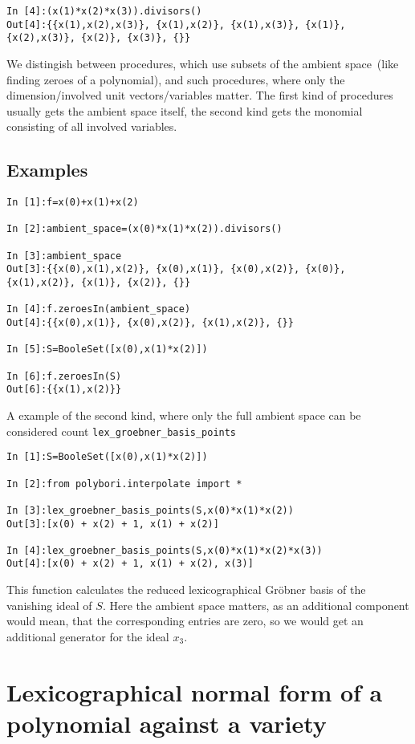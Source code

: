 \documentclass[]{article}
\newcommand{\Groebner}{Gr\"{o}bner\xspace}
\begin{document}
\begin{verbatim}
In [4]:(x(1)*x(2)*x(3)).divisors()
Out[4]:{{x(1),x(2),x(3)}, {x(1),x(2)}, {x(1),x(3)}, {x(1)}, {x(2),x(3)}, {x(2)}, {x(3)}, {}}
\end{verbatim}

We distingish between procedures, which use subsets of the ambient space~(like
finding zeroes of a polynomial),  and such procedures, where
only the dimension/involved unit vectors/variables matter.
The first kind of procedures usually gets the ambient space itself, the second kind gets the monomial consisting of all involved variables.

\subsection{Examples}
\begin{verbatim}
In [1]:f=x(0)+x(1)+x(2)

In [2]:ambient_space=(x(0)*x(1)*x(2)).divisors()

In [3]:ambient_space
Out[3]:{{x(0),x(1),x(2)}, {x(0),x(1)}, {x(0),x(2)}, {x(0)}, {x(1),x(2)}, {x(1)}, {x(2)}, {}}

In [4]:f.zeroesIn(ambient_space)
Out[4]:{{x(0),x(1)}, {x(0),x(2)}, {x(1),x(2)}, {}}

In [5]:S=BooleSet([x(0),x(1)*x(2)])

In [6]:f.zeroesIn(S)
Out[6]:{{x(1),x(2)}}
\end{verbatim}

A example of the second kind, where only the full ambient space can be considered count \verb|lex_groebner_basis_points|
\begin{verbatim}
In [1]:S=BooleSet([x(0),x(1)*x(2)])

In [2]:from polybori.interpolate import *              

In [3]:lex_groebner_basis_points(S,x(0)*x(1)*x(2))
Out[3]:[x(0) + x(2) + 1, x(1) + x(2)]

In [4]:lex_groebner_basis_points(S,x(0)*x(1)*x(2)*x(3))
Out[4]:[x(0) + x(2) + 1, x(1) + x(2), x(3)]
\end{verbatim}

This function calculates the reduced lexicographical \Groebner basis of the vanishing ideal of $S$.
Here the ambient space matters, as an additional component would mean, that the corresponding entries are zero, so we would get an additional generator for the ideal $x_3$.

\section{Lexicographical normal form of a polynomial against a variety}
\end{document}
